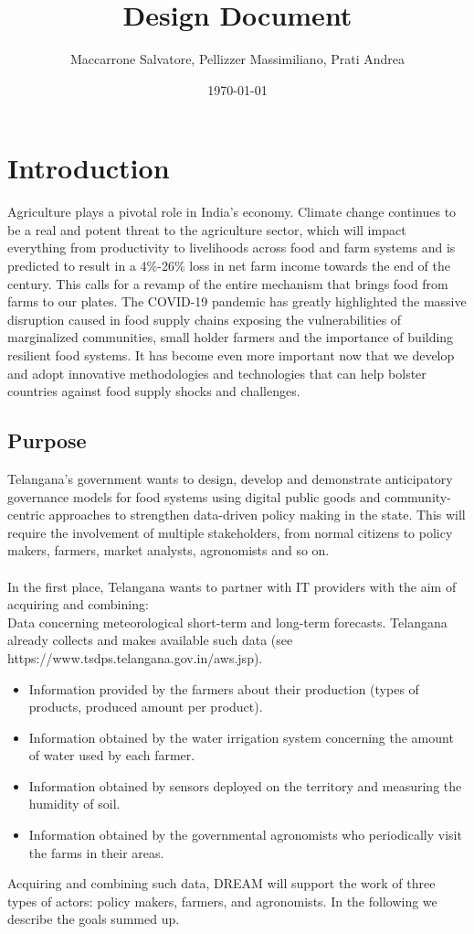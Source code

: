 \documentclass[10pt]{report}
\title{Design Document}
\author{Maccarrone Salvatore,   Pellizzer Massimiliano,   Prati Andrea}
\date{\today}
\begin{document}


\tableofcontents

\chapter{Introduction}
Agriculture plays a pivotal role in India’s economy. Climate change continues to be a real and potent threat to the agriculture sector, which will impact everything from productivity to livelihoods across food and farm systems and is predicted to result in a 4\%-26\% loss in net farm income towards the end of the century. This calls for a revamp of the entire mechanism that brings food from farms to our plates. The COVID-19 pandemic has greatly highlighted the massive disruption caused in food supply chains exposing the vulnerabilities of marginalized communities, small holder farmers and the importance of building resilient food systems. It has become even more important now that we develop and adopt innovative methodologies and technologies that can help bolster countries against food supply shocks and challenges.

    \section{Purpose}
    Telangana’s government wants to design, develop and demonstrate anticipatory governance models for food systems using digital public goods and community-centric approaches to strengthen data-driven policy making in the state. This will require the involvement of multiple stakeholders, from normal citizens to policy makers, farmers, market analysts, agronomists and so on. \\ \\
    In the first place, Telangana wants to partner with IT providers with the aim of acquiring and combining: \\ 
    Data concerning meteorological short-term and long-term forecasts. Telangana already collects and makes available such data (see https://www.tsdps.telangana.gov.in/aws.jsp).
    \begin{itemize}
    \item Information provided by the farmers about their production (types of products, produced amount per product). 
    \item Information obtained by the water irrigation system concerning the amount of water used by each farmer. 
    \item Information obtained by sensors deployed on the territory and measuring the humidity of soil.
    \item Information obtained by the governmental agronomists who periodically visit the farms in their areas.
    \end{itemize}
    Acquiring and combining such data, DREAM will support the work of three types of actors: policy makers, farmers, and agronomists. In the following we describe the goals summed up.
\end{document}

